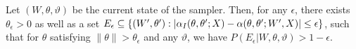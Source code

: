 \begin{proposition}
  Let $(W, \theta, \vartheta)$ be the current state of the sampler.
Then, for any $\epsilon$, there exists $\theta_\epsilon > 0$ as well as a set $E_\epsilon \subseteq \{(W', \theta'): |\alpha_I(\theta,\theta';X) - \alpha(\theta,\theta';W',X)| \le \epsilon\}$, such that for $\theta$ satisfying $\| \theta \| > \theta_\epsilon$ and any $\vartheta$, we have
$P(E_\epsilon|W,\theta,\vartheta) > 1-\epsilon$.
\label{prop:mix0}
\end{proposition}
